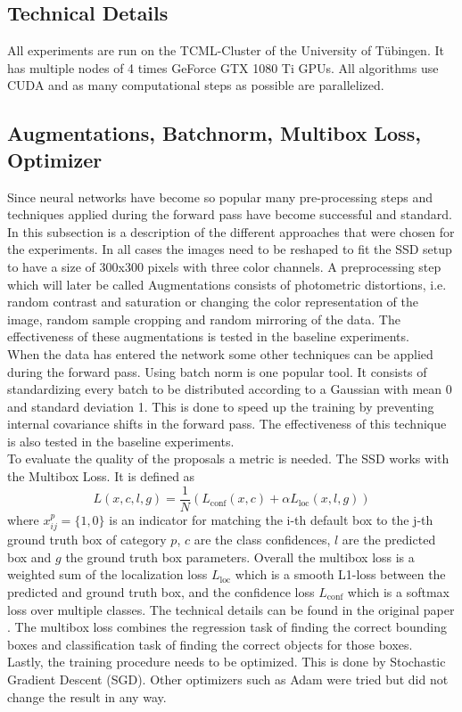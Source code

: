 \subsection{Technical Details}

All experiments are run on the TCML-Cluster of the University of Tübingen. It has multiple nodes of 4 times GeForce GTX 1080 Ti GPUs. All algorithms use CUDA and as many computational steps as possible are parallelized. 

\subsection{Augmentations, Batchnorm, Multibox Loss, Optimizer} 

Since neural networks have become so popular many pre-processing steps and techniques applied during the forward pass have become successful and standard. In this subsection is a description of the different approaches that were chosen for the experiments. In all cases the images need to be reshaped to fit the SSD setup to have a size of 300x300 pixels with three color channels. A preprocessing step which will later be called Augmentations consists of photometric distortions, i.e. random contrast and saturation or changing the color representation of the image, random sample cropping and random mirroring of the data. The effectiveness of these augmentations is tested in the baseline experiments. \\
When the data has entered the network some other techniques can be applied during the forward pass. Using batch norm \cite{BatchNorm} is one popular tool. It consists of standardizing every batch to be distributed according to a Gaussian with mean 0 and standard deviation 1. This is done to speed up the training by preventing internal covariance shifts in the forward pass. The effectiveness of this technique is also tested in the baseline experiments. \\
To evaluate the quality of the proposals a metric is needed. The SSD works with the Multibox Loss. It is defined as 
\begin{equation}
	\label{eq:multibox_loss}
	L(x,c,l,g) = \frac{1}{N}(L_{\text{conf}} (x,c) + \alpha L_{\text{loc}} (x,l,g))
\end{equation}
where $x^p_{ij}=\{1,0\}$ is an indicator for matching the i-th default box to the j-th ground truth box of category $p$, $c$ are the class confidences, $l$ are the predicted box and $g$ the ground truth box parameters. Overall the multibox loss is a weighted sum of the localization loss $L_{\text{loc}}$ which is a smooth L1-loss between the predicted and ground truth box, and the confidence loss $L_{\text{conf}}$ which is a softmax loss over multiple classes. The technical details can be found in the original paper \cite{SSD}. The multibox loss combines the regression task of finding the correct bounding boxes and classification task of finding the correct objects for those boxes. \\
Lastly, the training procedure needs to be optimized. This is done by Stochastic Gradient Descent (SGD). Other optimizers such as Adam were tried but did not change the result in any way. 

